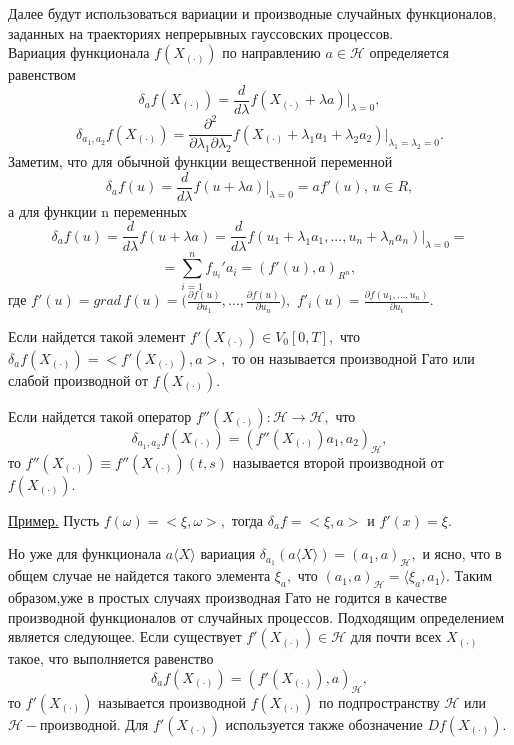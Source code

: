 \documentclass [a4paper, 12pt]{report}
\begin{document}
Далее будут использоваться вариации и производные случайных функционалов, заданных на
траекториях непрерывных гауссовских процессов.\\
Вариация функционала $f(X_{(\cdot)})$ по направлению $a\in\mathcal{H}$
определяется равенством
\begin{equation}\label{eq:29}
\delta_a f(X_{(\cdot)})=\frac{d}{d\lambda}f(X_{(\cdot)}+\lambda a)\Big|_{\lambda=0},
\end{equation}
$$
\delta_{a_1,a_2} f(X_{(\cdot)})=\frac{\partial^2}{\partial \lambda_1 \partial \lambda_2}f(X_{(\cdot)}+\lambda_1 a_1 + \lambda_2 a_2)\Big|_{\lambda_1 = \lambda_2 =0}.
$$
Заметим, что для обычной функции вещественной переменной
$$\delta_a f(u)=
\frac{d}{d\lambda}f(u+\lambda a)\Big|_{\lambda =0}=af'(u), \, u\in R,$$
а для функции n переменных
$$
\delta_a f(u)=\frac{d}{d\lambda}f(u+\lambda a)=
\frac{d}{d\lambda}f(u_1+\lambda_1 a_1,...,u_n+\lambda_n a_n)\Big|_{\lambda = 0}=
$$
\begin{equation}\label{eq:30}
=\sum_{i=1}^n f_{u_i}'a_i=(f'(u),a)_{R^n},
 \,
 \end{equation}
где $f'(u)=grad \, f(u)=
\Big(\frac{\partial f(u)}{\partial u_1},\ldots,
\frac{\partial f(u)}{\partial u_n}\Big),$
$f'_i(u)=\frac{\partial f(u_1,\ldots,u_n)}{\partial u_i}.$

Если найдется такой элемент $f'(X_{(\cdot)})\in V_0[0,T],$ что
$\delta_a f(X_{(\cdot)})=<f'(X_{(\cdot)}),a>,$ то он называется
производной Гато или слабой производной от $f(X_{(\cdot)}).$

Если найдется такой оператор $f''(X_{(\cdot)}): \mathcal{H} \rightarrow \mathcal{H}, $ что
$$
\delta_{a_1, a_2}f(X_{(\cdot)}) = (f''(X_{(\cdot)})a_1,a_2)_{\mathcal{H}},
$$
то $f''(X_{(\cdot)})\equiv f''(X_{(\cdot)})(t,s)$ называется второй производной от $ f(X_{(\cdot)}).$

\underline{Пример.} Пусть $f(\omega)=<\xi,\omega>,$
тогда $\delta_a f = <\xi,a>$ и $f'(x)=\xi.$

Но уже для функционала $a\langle X\rangle$ вариация
$\delta_{a_1}(a\langle X\rangle)=(a_1,a)_\mathcal{H},$
и ясно, что в общем случае не найдется такого элемента $\xi_a,$
что $(a_1,a)_\mathcal{H}=\langle \xi_a,a_1\rangle.$
Таким образом,уже в простых случаях производная Гато не годится
в качестве производной функционалов от случайных процессов.
Подходящим определением является следующее.
 Если существует $f'(X_{(\cdot)})\in\mathcal{H}$ для почти всех $X_{(\cdot)}$
такое, что выполняется равенство
 \begin{equation}\label{eq:31}
 \delta_a f(X_{(\cdot)})=(f'(X_{(\cdot)}),a)_{\mathcal{H}},
 \end{equation}
 то $f'(X_{(\cdot)})$ называется производной $f(X_{(\cdot)})$ по подпространству
 $\mathcal{H}$ или $\mathcal{H}-$производной. Для $f'(X_{(\cdot)})$ используется
 также обозначение  $Df(X_{(\cdot)}).$
\end{document}
